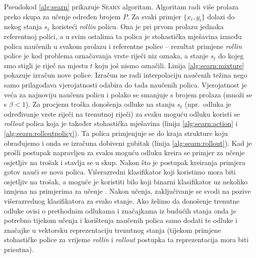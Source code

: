 Pseudokod \ref{alg:searn} prikazuje \textsc{Searn} algoritam. Algoritam radi
više prolaza preko skupa za učenje određen brojem $P$. Za svaki primjer $\{x_i,
y_i\}$ dolazi do nekog stanja $s_t$ koristeći \textit{rollin} policu. Ona je pri
prvom prolazu jednaka referentnoj polici, a u svim ostalima ta polica je
stohastička mješavina između polica naučenih u svakom prolazu i referentne
police -- rezultat primjene \textit{rollin} police je kod problema označavanja
vrste riječi niz oznaka, a stanje $s_t$ do kojeg smo stigli je riječ na mjestu
$t$ koju još nismo označili. Linija \ref{alg:searn:mixture} pokazuje izračun
nove police. Izračun ne radi interpolaciju naučenih težina nego samo prilagođava
vjerojatnosti odabira do tada naučenih polica. Vjerojatnost je veća za najnoviju
naučenu policu i polako se smanjuje s brojem prolaza (množi se s $\beta < 1$).
Za procjenu troška donošenja odluke na stanju $s_t$ (npr.~odluka je određivanje
vrste riječi na trenutnoj riječi) za svaku moguću odluku koristi se
\textit{rollout} polica koja je također stohastička mješavina (linija
\ref{alg:searn:action} i \ref{alg:searn:rolloutpolicy}). Ta polica primjenjuje
se do kraja strukture koju obrađujemo i onda se izračuna dobiveni gubitak
(linija \ref{alg:searn:rollout}). Kad je prošli postupak napravljen za svaku
moguću odluku kreira se primjer za učenje osjetljiv na trošak i stavlja se u
skup. Nakon što je postupak kreiranja primjera gotov nauči se nova polica.
Višerazredni klasifikator koji koristimo mora biti osjetljiv na trošak, a moguće
je koristiti bilo koji binarni klasifikator uz nekoliko izmjena na primjerima za
učenje \citep{zadrozny2003cost, beygelzimer2005weighted, beygelzimer2005error}.
Nakon učenja, zaključivanje se svodi na pozive višerazrednog klasifikatora za
svako stanje. Ako želimo da donošenje trenutne odluke ovisi o prethodnim
odlukama i značajkama iz budućih stanja onda je potrebno tijekom učenja i
korištenja naučenih polica samo dodati te odluke i značajke u vektorsku
reprezentaciju trenutnog stanja (tijekom primjene stohastičke police za vrijeme
\textit{rollin} i \textit{rollout} postupka ta reprezentacija mora biti
prisutna).

